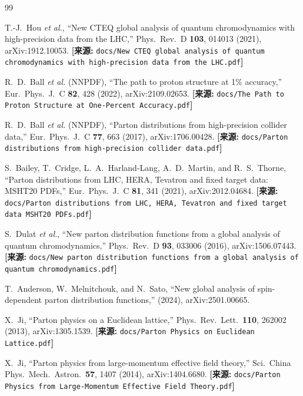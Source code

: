 \documentclass[12pt,a4paper]{ctexart}
\theoremstyle{definition}
\begin{document}
\begin{thebibliography}{99}

T.-J.~Hou \textit{et al.},
``New CTEQ global analysis of quantum chromodynamics with high-precision data from the LHC,''
Phys.\ Rev.\ D \textbf{103}, 014013 (2021), arXiv:1912.10053.
\quad\textbf{[来源:} \texttt{docs/New CTEQ global analysis of quantum chromodynamics with high-precision data from the LHC.pdf}\textbf{]}

R.~D.~Ball \textit{et al.} (NNPDF),
``The path to proton structure at 1\% accuracy,''
Eur.\ Phys.\ J.\ C \textbf{82}, 428 (2022), arXiv:2109.02653.
\quad\textbf{[来源:} \texttt{docs/The Path to Proton Structure at One-Percent Accuracy.pdf}\textbf{]}

R.~D.~Ball \textit{et al.} (NNPDF),
``Parton distributions from high-precision collider data,''
Eur.\ Phys.\ J.\ C \textbf{77}, 663 (2017), arXiv:1706.00428.
\quad\textbf{[来源:} \texttt{docs/Parton distributions from high-precision collider data.pdf}\textbf{]}

S.~Bailey, T.~Cridge, L.~A.~Harland-Lang, A.~D.~Martin, and R.~S.~Thorne,
``Parton distributions from LHC, HERA, Tevatron and fixed target data: MSHT20 PDFs,''
Eur.\ Phys.\ J.\ C \textbf{81}, 341 (2021), arXiv:2012.04684.
\quad\textbf{[来源:} \texttt{docs/Parton distributions from LHC, HERA, Tevatron and fixed target data MSHT20 PDFs.pdf}\textbf{]}

S.~Dulat \textit{et al.},
``New parton distribution functions from a global analysis of quantum chromodynamics,''
Phys.\ Rev.\ D \textbf{93}, 033006 (2016), arXiv:1506.07443.
\quad\textbf{[来源:} \texttt{docs/New parton distribution functions from a global analysis of quantum chromodynamics.pdf}\textbf{]}

T.~Anderson, W.~Melnitchouk, and N.~Sato,
``New global analysis of spin-dependent parton distribution functions,''
(2024), arXiv:2501.00665.

X.~Ji,
``Parton physics on a Euclidean lattice,''
Phys.\ Rev.\ Lett.\ \textbf{110}, 262002 (2013), arXiv:1305.1539.
\quad\textbf{[来源:} \texttt{docs/Parton Physics on Euclidean Lattice.pdf}\textbf{]}

X.~Ji,
``Parton physics from large-momentum effective field theory,''
Sci.\ China Phys.\ Mech.\ Astron.\ \textbf{57}, 1407 (2014), arXiv:1404.6680.
\quad\textbf{[来源:} \texttt{docs/Parton Physics from Large-Momentum Effective Field Theory.pdf}\textbf{]}


\end{thebibliography}
\end{document}
